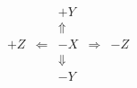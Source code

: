\documentclass{article}
\begin{document}
\pagecolor{red!20}
\huge \bf
\[
\begin{array}{ccccc}
  && +Y && \\
  &&\Uparrow && \\
+Z & \Leftarrow & -X& \Rightarrow & -Z \\
  &&\Downarrow && \\
&& -Y && 
\end{array}
\]
\end{document}
